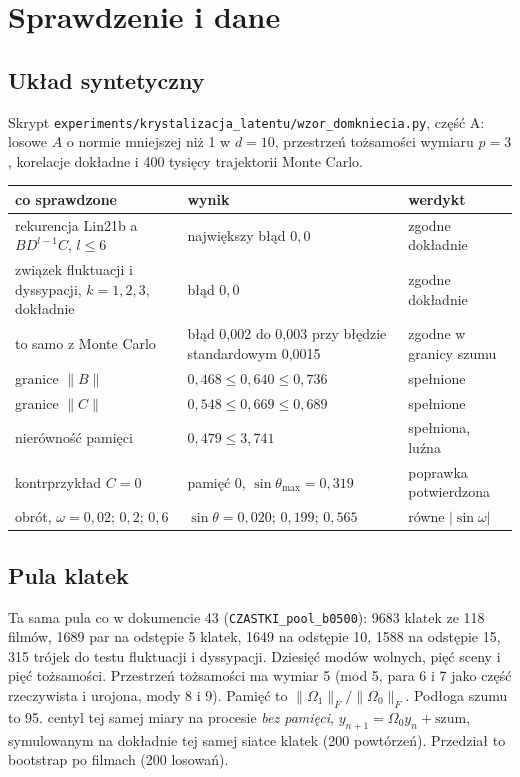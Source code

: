 \documentclass[11pt,a4paper]{article}
\theoremstyle{definition}
\theoremstyle{remark}
\newcommand{\norm}[1]{\lVert #1\rVert}
\begin{document}
\section{Sprawdzenie i dane}\label{sec:dane}

\subsection*{Układ syntetyczny}
Skrypt \texttt{experiments/krystalizacja\_latentu/wzor\_domkniecia.py}, część A: losowe $A$ o normie mniejszej
niż 1 w $d=10$, przestrzeń tożsamości wymiaru $p=3$, korelacje dokładne i 400 tysięcy trajektorii Monte Carlo.

\begin{center}\small
\begin{tabular}{@{}p{5.4cm}p{6.2cm}p{3.6cm}@{}}
\toprule
co sprawdzone & wynik & werdykt\\
\midrule
rekurencja Lin21b a $BD^{l-1}C$, $l\le 6$ & największy błąd $0{,}0$ & zgodne dokładnie\\
związek fluktuacji i dyssypacji, $k=1,2,3$, dokładnie & błąd $0{,}0$ & zgodne dokładnie\\
to samo z Monte Carlo & błąd 0,002 do 0,003 przy błędzie standardowym 0,0015 & zgodne w granicy szumu\\
granice $\norm{B}$ & $0{,}468 \le 0{,}640 \le 0{,}736$ & spełnione\\
granice $\norm{C}$ & $0{,}548 \le 0{,}669 \le 0{,}689$ & spełnione\\
nierówność pamięci & $0{,}479 \le 3{,}741$ & spełniona, luźna\\
kontrprzykład $C=0$ & pamięć $0$, $\sin\theta_{\max}=0{,}319$ & poprawka potwierdzona\\
obrót, $\omega = 0{,}02;\,0{,}2;\,0{,}6$ & $\sin\theta = 0{,}020;\,0{,}199;\,0{,}565$ & równe $|\sin\omega|$\\
\bottomrule
\end{tabular}
\end{center}

\subsection*{Pula klatek}
Ta sama pula co w dokumencie 43 (\texttt{CZASTKI\_pool\_b0500}): 9683 klatek ze 118 filmów, 1689 par na odstępie
5 klatek, 1649 na odstępie 10, 1588 na odstępie 15, 315 trójek do testu fluktuacji i dyssypacji. Dziesięć modów
wolnych, pięć sceny i pięć tożsamości. Przestrzeń tożsamości ma wymiar 5 (mod 5, para 6 i 7 jako część
rzeczywista i urojona, mody 8 i 9). Pamięć to $\norm{\Omega_1}_F/\norm{\Omega_0}_F$. Podłoga szumu to
95. centyl tej samej miary na procesie \emph{bez pamięci}, $y_{n+1} = \Omega_0 y_n + \text{szum}$, symulowanym
na dokładnie tej samej siatce klatek (200 powtórzeń). Przedział to bootstrap po filmach (200 losowań).
\end{document}

